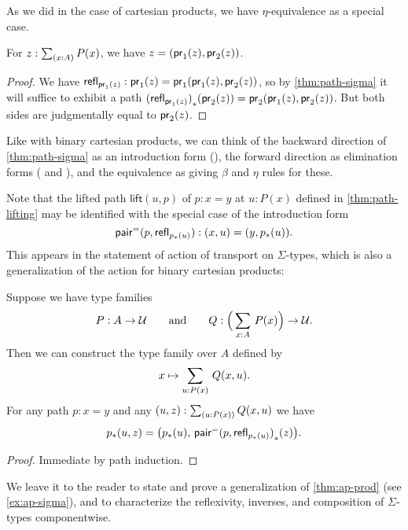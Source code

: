As we did in the case of cartesian products, we have $\eta$-equivalence as a special case.

\begin{cor}\label{thm:eta-sigma}
  For $z:\sm{x:A} P(x)$, we have $z = (\mathsf{pr}_{1}(z),\mathsf{pr}_{2}(z))$.
\end{cor}
\begin{proof}
  We have $\mathsf{refl}_{\mathsf{pr}_{1}(z)} : \mathsf{pr}_{1}(z) = \mathsf{pr}_{1}(\mathsf{pr}_{1}(z),\mathsf{pr}_{2}(z))$, so by \autoref{thm:path-sigma} it will suffice to exhibit a path ${(\mathsf{refl}_{\mathsf{pr}_{1}(z)})}_{*}\mathopen{}\left({\mathsf{pr}_{2}(z)}\right)\mathclose{} = \mathsf{pr}_{2}(\mathsf{pr}_{1}(z),\mathsf{pr}_{2}(z))$.
  But both sides are judgmentally equal to $\mathsf{pr}_{2}(z)$.
\end{proof}

Like with binary cartesian products, we can think of 
the backward direction of \autoref{thm:path-sigma} as
an introduction form (\pairpath{}{}), the forward direction as
elimination forms ( and ), and the equivalence
as giving $\beta$ and $\eta$ rules for these.  

Note that the lifted path $\mathsf{lift}(u,p)$  of $p:x=y$ at $u:P(x)$ defined in \autoref{thm:path-lifting} may be identified with the special case of the introduction form
\[\mathsf{pair}^{\mathord{=}}(p,\mathsf{refl}_{{p}_{*}\mathopen{}\left({u}\right)\mathclose{}}):(x,u) = (y,{p}_{*}\mathopen{}\left({u}\right)\mathclose{}).\]
This appears in the statement of action of transport on $\Sigma$-types, which is also a generalization of the action for binary cartesian products:

\begin{thm}\label{transport-Sigma}
  Suppose we have type families
  \begin{equation*}
    P:A\to\type
    \qquad\text{and}\qquad
    Q:\Big(\sm{x:A} P(x)\Big)\to\type.
  \end{equation*}
  Then we can construct the type family over $A$ defined by
  \begin{equation*}
    x \mapsto \sm{u:P(x)} Q(x,u).
  \end{equation*}
  For any path $p:x=y$ and any $(u,z):\sm{u:P(x)} Q(x,u)$ we have
  \begin{equation*}
    {p}_{*}\mathopen{}\left({u,z}\right)\mathclose{}=\big({p}_{*}\mathopen{}\left({u}\right)\mathclose{},\,{\mathsf{pair}^{\mathord{=}}(p,\mathsf{refl}_{{p}_{*}\mathopen{}\left({u}\right)\mathclose{}})}_{*}\mathopen{}\left({z}\right)\mathclose{}\big).
  \end{equation*}
\end{thm}

\begin{proof}
Immediate by path induction.
\end{proof}

We leave it to the reader to state and prove a generalization of
\autoref{thm:ap-prod} (see \autoref{ex:ap-sigma}), and to characterize
the reflexivity, inverses, and composition of $\Sigma$-types
componentwise.

